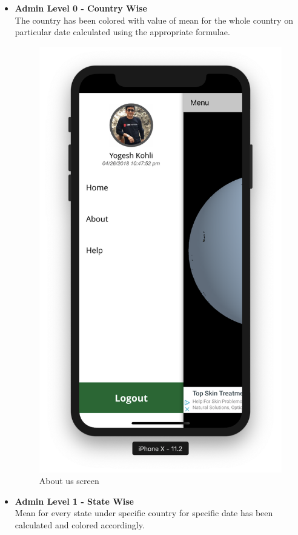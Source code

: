 \begin{itemize}
    \item \textbf{Admin Level 0 - Country Wise} \\
    The country has been colored with value of mean for the whole country on particular date calculated using the appropriate formulae. \\
    
     \begin{figure}[H]
            \centering
            \includegraphics[width=0.5\linewidth]{figures/ch2/side_menu.png}
            \caption{\label{fig:pass_recovery_1} About us screen}
        \end{figure}
    
    \newpage
    
    \item \textbf{Admin Level 1 - State Wise} \\
    Mean for every state under specific country for specific date has been calculated and colored accordingly. \\
    

\end{itemize}
